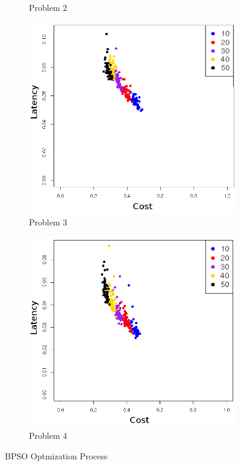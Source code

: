 \begin{figure}[!h]
\begin{subfigure}{0.4\textwidth}
	   \caption{Problem 2}
   \end{subfigure}
   \begin{subfigure}{0.4\textwidth}
       \includegraphics[width=\textwidth]{pics/binaryevolve3.png}
	   \caption{Problem 3}
   \end{subfigure}
   \begin{subfigure}{0.4\textwidth}
       \includegraphics[width=\textwidth]{pics/binaryevolve4.png}
	   \caption{Problem 4}
   \end{subfigure}

   \caption{BPSO Optmization Process}
   \label{fig:bpso_evolve}
\end{figure}



